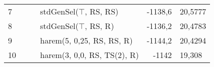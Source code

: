 \documentclass[./FM_mgr.tex]{subfiles}
\begin{document}
\begin{table}[h]
\begin{tabular}{|l|l|l|l|r@{$\pm$}l|}
		7 & &                                        & stdGenSel($\top$, RS, RS)              & -1138,6                 & 20,5777                 \\ \cline{1-1}\cline{4-6} 
		8 & &                                        & stdGenSel($\top$, RS, R)               & -1136,2                 & 20,4783                 \\ \cline{1-1}\cline{4-6} 
		9 & &                                        & harem(5, 0,25, RS, RS, R)              & -1144,2                 & 20,4294                 \\ \cline{1-1}\cline{4-6} 
		10 & &                                        & harem(3, 0,0, RS, TS(2), R)            & -1142                   & 19,308                  \\ \hline
	\end{tabular}
\end{table}
\end{document}
